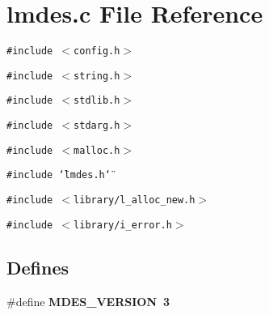 \section{lmdes.c File Reference}
\label{lmdes_8c}
{\tt \#include $<$config.h$>$}\par
{\tt \#include $<$string.h$>$}\par
{\tt \#include $<$stdlib.h$>$}\par
{\tt \#include $<$stdarg.h$>$}\par
{\tt \#include $<$malloc.h$>$}\par
{\tt \#include \char`\"{}lmdes.h\char`\"{}}\par
{\tt \#include $<$library/l\_\-alloc\_\-new.h$>$}\par
{\tt \#include $<$library/i\_\-error.h$>$}\par
\subsection*{Defines}
\begin{CompactItemize}
\item 
\#define \bf{MDES\_\-VERSION}~3
\end{CompactItemize}
